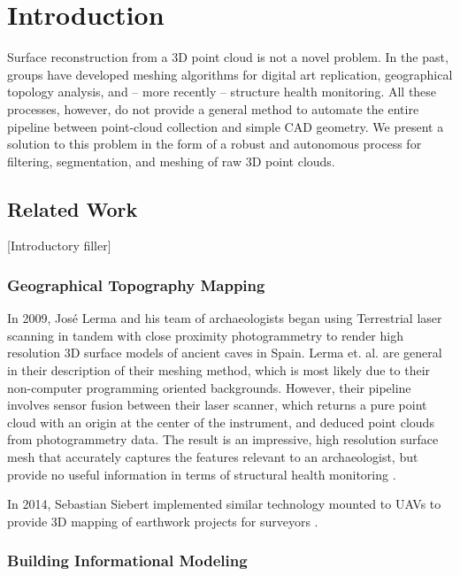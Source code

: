 \documentclass[12pt]{drexelthesis}
\let\Oldsection\section
\renewcommand{\section}{\FloatBarrier\Oldsection}
\let\Oldsubsection\subsection
\renewcommand{\subsection}{\FloatBarrier\Oldsubsection}
\begin{document}
\setcounter{page}{0}
\chapter{Introduction}
\label{chap:introduction}

Surface reconstruction from a 3D point cloud is not a novel problem. In the past, groups have developed meshing algorithms for digital art replication, geographical topology analysis, and – more recently – structure health monitoring. All these processes, however, do not provide a general method to automate the entire pipeline between point-cloud collection and simple CAD geometry. We present a solution to this problem in the form of a robust and autonomous process for filtering, segmentation, and meshing of raw 3D point clouds.

\section{Related Work}
\label{sec:related}
[Introductory filler]
\subsection{Geographical Topography Mapping}
\label{subsec:topographymapping}
In 2009, José Lerma and his team of archaeologists began using Terrestrial laser scanning in tandem with close proximity photogrammetry to render high resolution 3D surface models of ancient caves in Spain. Lerma et. al. are general in their description of their meshing method, which is most likely due to their non-computer programming oriented backgrounds. However, their pipeline involves sensor fusion between their laser scanner, which returns a pure point cloud with an origin at the center of the instrument, and deduced point clouds from photogrammetry data. The result is an impressive, high resolution surface mesh that accurately captures the features relevant to an archaeologist, but provide no useful information in terms of structural health monitoring \cite{RN50}.

In 2014, Sebastian Siebert implemented similar technology mounted to UAVs to provide 3D mapping of earthwork projects for surveyors \cite{RN48}.
\subsection{Building Informational Modeling}
\label{subsec:BIM}
\end{document}
